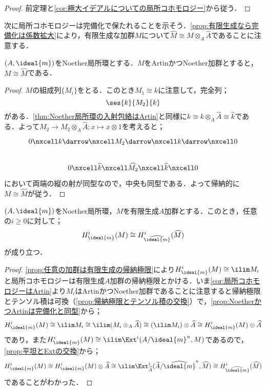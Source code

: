 \begin{proof}
	前定理と\ref{cor:極大イデアルについての局所コホモロジー}から従う．
\end{proof}

次に局所コホモロジーは完備化で保たれることを示そう．\ref{prop:有限生成なら完備化は係数拡大}により，有限生成な加群$M$について$\widehat{M}\cong M\otimes_A\widehat{A}$であることに注意する．
\begin{prop}\label{prop:NoetherかつArtinは完備化と同型}
	$(A,\ideal{m})$をNoether局所環とする．$M$をArtinかつNoether加群とすると，$M\cong\widehat{M}$である．
\end{prop}

\begin{proof}
	$M$の組成列$\{M_i\}$をとる．このとき$M_1\cong k$に注意して，完全列；
	\[\ses{k}{M_2}{k}\]
	がある．\ref{thm:Noether局所環の入射包絡はArtin}と同様に$k\cong k\otimes_A\widehat{A}\cong\widehat{k}$である．よって$M_2\to M_2\otimes_A\widehat{A};x\mapsto x\otimes 1$を考えると；
	\[\begin{tikzcd}
		0\nxcell k\darrow\nxcell M_2\darrow\nxcell k\darrow\nxcell 0\\
		0\nxcell\widehat{k}\nxcell\widehat{M_2}\nxcell\widehat{k}\nxcell 0
	\end{tikzcd}\]
	において両端の縦の射が同型なので，中央も同型である．よって帰納的に$M\cong\widehat{M}$が従う．
\end{proof}

\begin{thm}\label{thm:完備化してもlocal cohomは同型}
	$(A,\ideal{m})$をNoether局所環，$M$を有限生成$A$加群とする．このとき，任意の$i\geq 0$に対して；
	\[H^i_{\ideal{m}}(M)\cong H^i_{\widehat{\ideal{m}}}(\widehat{M})\]
	が成り立つ．
\end{thm}

\begin{proof}
	\ref{prop:任意の加群は有限生成の帰納極限}により$H^i_{\ideal{m}}(M)\cong\ilim M_i$と局所コホモロジーは有限生成$A$加群の帰納極限とかける．いま\ref{cor:局所コホモロジーはArtin}より$M_i$はArtinかつNoether加群であることに注意すると帰納極限とテンソル積は可換（\ref{prop:帰納極限とテンソル積の交換}）で，\ref{prop:NoetherかつArtinは完備化と同型}から；
	\[H^i_{\ideal{m}}(M)\cong\ilim M_i\cong\ilim(M_i\otimes_A\widehat{A})\cong(\ilim M_i)\otimes \widehat{A}\cong H^i_{\ideal{m}}(M)\otimes\widehat{A}\]
	であり，また$H^i_{\ideal{m}}(M)\cong\ilim\Ext^i(A/\ideal{m}^n,M)$であるので，\ref{prop:平坦とExtの交換}から；
	\[H^i_{\ideal{m}}(M)\cong H^i_{\ideal{m}}(M)\otimes\widehat{A}\cong\ilim\Ext^i_{\widehat{A}}(\widehat{A}/\widehat{\ideal{m}}^n,\widehat{M})\cong H^i_{\widehat{\ideal{m}}}(\widehat{M})\]
	であることがわかった．
\end{proof}

